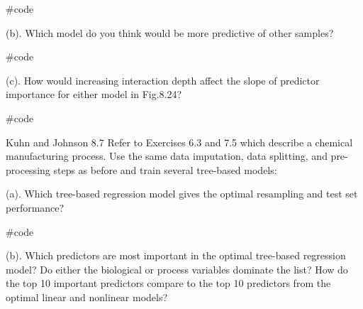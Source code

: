 \documentclass[openany]{report}
\newenvironment{Shaded}{\begin{snugshade}}{\end{snugshade}}
\newcommand{\CommentTok}[1]{\textcolor[rgb]{0.50,0.62,0.50}{#1}}
\begin{document}
\begin{Shaded}
\begin{Highlighting}[]
\CommentTok{#code}
\end{Highlighting}
\end{Shaded}

\begin{subquestion}{(b).} Which model do you think would be more predictive of other samples?\end{subquestion}

\begin{Shaded}
\begin{Highlighting}[]
\CommentTok{#code}
\end{Highlighting}
\end{Shaded}

\begin{subquestion}{(c).} How would increasing interaction depth affect the slope of predictor importance for either model in Fig.8.24?\end{subquestion}

\begin{Shaded}
\begin{Highlighting}[]
\CommentTok{#code}
\end{Highlighting}
\end{Shaded}


\begin{question}{Kuhn and Johnson 8.7}
Refer to Exercises 6.3 and 7.5 which describe a chemical manufacturing process. Use the same data imputation, data splitting, and pre-processing steps as before and train several tree-based models:
\end{question}

\begin{subquestion}{(a).} Which tree-based regression model gives the optimal resampling and test set performance? \end{subquestion}

\begin{Shaded}
\begin{Highlighting}[]
\CommentTok{#code}
\end{Highlighting}
\end{Shaded}

\begin{subquestion}{(b).} Which predictors are most important in the optimal tree-based regression model? Do either the biological or process variables dominate the list? How do the top 10 important predictors compare to the top 10 predictors from the optimal linear and nonlinear models?\end{subquestion}
\end{document}
